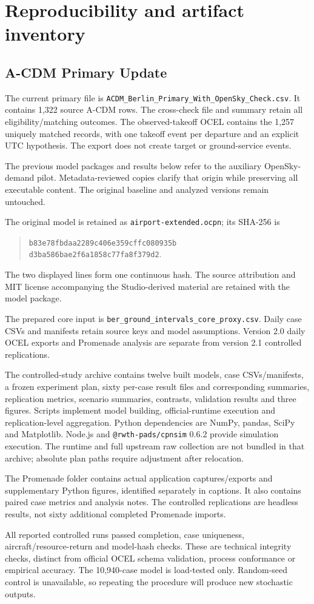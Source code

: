\chapter{Reproducibility and artifact inventory}
\label{app:repro}
\section{A-CDM Primary Update}
The current primary file is \texttt{ACDM\_Berlin\_Primary\_With\_OpenSky\_Check.csv}. It contains 1,322 source A-CDM rows. The cross-check file and summary retain all eligibility/matching outcomes. The observed-takeoff OCEL contains the 1,257 uniquely matched records, with one takeoff event per departure and an explicit UTC hypothesis. The export does not create target or ground-service events.

The previous model packages and results below refer to the auxiliary OpenSky-demand pilot. Metadata-reviewed copies clarify that origin while preserving all executable content. The original baseline and analyzed versions remain untouched.

The original model is retained as \texttt{airport-extended.ocpn}; its SHA-256 is
\begin{quote}\footnotesize\texttt{b83e78fbdaa2289c406e359cffc080935b}\\
\texttt{d3ba586bae2f6a1858c77fa8f379d2}.\end{quote}
The two displayed lines form one continuous hash. The source attribution and MIT license accompanying the Studio-derived material are retained with the model package.

The prepared core input is \texttt{ber\_ground\_intervals\_core\_proxy.csv}. Daily case CSVs and manifests retain source keys and model assumptions. Version 2.0 daily OCEL exports and Promenade analysis are separate from version 2.1 controlled replications.

The controlled-study archive contains twelve built models, case CSVs/manifests, a frozen experiment plan, sixty per-case result files and corresponding summaries, replication metrics, scenario summaries, contrasts, validation results and three figures. Scripts implement model building, official-runtime execution and replication-level aggregation. Python dependencies are NumPy, pandas, SciPy and Matplotlib. Node.js and \texttt{@rwth-pads/cpnsim} 0.6.2 provide simulation execution. The runtime and full upstream raw collection are not bundled in that archive; absolute plan paths require adjustment after relocation.

The Promenade folder contains actual application captures/exports and supplementary Python figures, identified separately in captions. It also contains paired case metrics and analysis notes. The controlled replications are headless results, not sixty additional completed Promenade imports.

All reported controlled runs passed completion, case uniqueness, aircraft/resource-return and model-hash checks. These are technical integrity checks, distinct from official OCEL schema validation, process conformance or empirical accuracy. The 10,940-case model is load-tested only. Random-seed control is unavailable, so repeating the procedure will produce new stochastic outputs.
